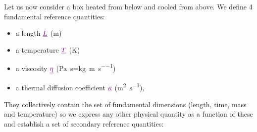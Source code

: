 \documentclass[a4paper,11pt]{article}
\begin{document}
Let us now consider a box heated from below and cooled from above. 
We define 4 {\color{violet} fundamental reference} quantities:
\begin{itemize}
\item a length ${\color{violet} \underline{L}}$ (\si{\metre})
\item a temperature ${\color{violet} \underline{T}}$ (\si{\kelvin})
\item a viscosity ${\color{violet} \underline{\eta}}$ (\si{\pascal\second}=\si{\kg\per\meter\per\second})
\item a thermal diffusion coefficient ${\color{violet} \underline{\kappa}}$ (\si{\square\metre\per\second}), 
\end{itemize}
They collectively contain the set of {\color{violet}fundamental dimensions} (length, time, mass and temperature) so we express any other physical quantity as a function of these and
establish a set of {\color{purple}secondary reference} quantities:
\end{document}
